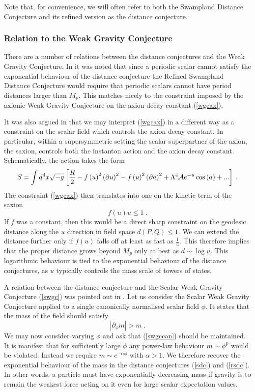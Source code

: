 \documentclass[11pt,a4paper]{article}
\numberwithin{equation}{section}
\numberwithin{table}{section}\setlength{\multlinegap}{25pt}
\newcommand{\be}{\begin{equation}}
\newcommand{\ee}{\end{equation}}
\begin{document}
Note that, for convenience, we will often refer to both the Swampland Distance Conjecture and its refined version as the distance conjecture. 

\subsubsection{Relation to the Weak Gravity Conjecture} 
\label{sec:distswgc}

There are a number of relations between the distance conjectures and the Weak Gravity Conjecture. In \cite{Klaewer:2016kiy} it was noted that since a periodic scalar cannot satisfy the exponential behaviour of the distance conjecture the Refined Swampland Distance Conjecture would require that periodic scalars cannot have period distances larger than $M_p$. This matches nicely to the constraint imposed by the axionic Weak Gravity Conjecture on the axion decay constant (\ref{wgcax}).

 It was also argued in \cite{Baume:2016psm} that we may interpret (\ref{wgcax}) in a different way as a constraint on the scalar field which controls the axion decay constant. In particular, within a supersymmetric setting the scalar superpartner of the axion, the saxion, controls both the instanton action and the axion decay constant. Schematically, the action takes the form
\be
S = \int d^4x \sqrt{-g}\left[ \frac{R}{2} - f\left(u\right)^2 \left(\partial u \right)^2 - f\left(u\right)^2 \left(\partial a \right)^2 + \Lambda^4 {\cal A} e^{-u} \cos \left( a \right) + ...  \right] \;.
\ee
The constraint (\ref{wgcax}) then translates into one on the kinetic term of the saxion
\be
f\left(u\right) u \leq 1 \;.
\ee
If $f$ was a constant, then this would be a direct sharp constraint on the geodesic distance along the $u$ direction in field space $d\left(P,Q\right) \leq 1$. We can extend the distance further only if $f\left( u\right)$ falls off at least as fast as $\frac{1}{u}$. This therefore implies that the proper distance grows beyond $M_p$ only at best as $d \sim \log u$. This logarithmic behaviour is tied to the exponential behaviour of the distance conjectures, as $u$ typically controls the mass scale of towers of states.

A relation between the distance conjecture and the Scalar Weak Gravity Conjecture (\ref{swgc}) was pointed out in \cite{Palti:2017elp}. Let us consider the Scalar Weak Gravity Conjecture applied to a single canonically normalised scalar field $\phi$. It states that the mass of the field should satisfy
\be
\label{swgccan}
\left|\partial_{\phi} m\right| > m \;.
\ee
We may now consider varying $\phi$ and ask that (\ref{swgccan}) should be maintained. It is manifest that for sufficiently large $\phi$ any power-law behaviour $m \sim \phi^p$ would be violated. Instead we require $m \sim e^{-\alpha \phi}$ with $\alpha > 1$. We therefore recover the exponential behaviour of the mass in the distance conjectures (\ref{sdc}) and (\ref{rsdc}). In other words, a particle must have exponentially decreasing mass if gravity is to remain the weakest force acting on it even for large scalar expectation values. 
\end{document}
